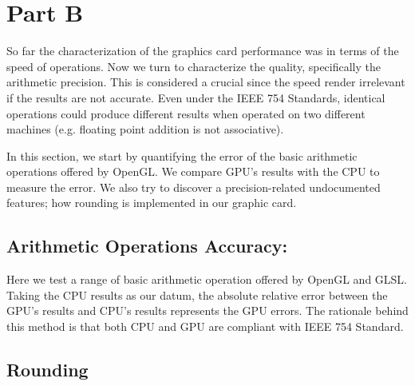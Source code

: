\section{Part B}
So far the characterization of the graphics card performance was in terms of the speed of operations. Now we turn to characterize the quality, specifically the arithmetic precision. This is considered a crucial since the speed render irrelevant if the results are not accurate. Even under the IEEE 754 Standards, identical operations could produce different results when operated on two different machines (e.g. floating point addition is not associative). 

In this section, we start by quantifying the error of the basic arithmetic operations offered by OpenGL. We compare GPU's results with the CPU to measure the error. We also try to discover a precision-related undocumented features; how rounding is implemented in our graphic card. 

\subsection{Arithmetic Operations Accuracy:}
Here we test a range of basic arithmetic operation offered by OpenGL and GLSL. Taking the CPU results as our datum, the absolute relative error between the GPU's results and CPU's results represents the GPU errors. The rationale behind this method is that both CPU and GPU are compliant with IEEE 754 Standard. %



\cite{stuart2013mobile}


\subsection{Rounding}



